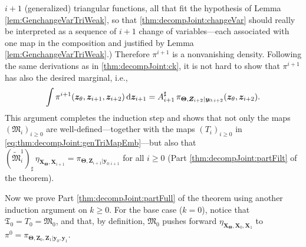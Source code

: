 \documentclass[twoside,11pt]{article}
\newcommand{\push}{_\sharp}                                      %
\newcommand{\Xb}{\boldsymbol{X}}
\newcommand{\yb}{\boldsymbol{y}}
\newcommand{\Zb}{\boldsymbol{Z}}
\newcommand{\zb}{\boldsymbol{z}}
\newcommand{\vhyp}{\boldsymbol{\Theta}}
\newcommand{\vhyps}{\theta}
\newcommand{\submap}{\mathfrak{M}}
\newcommand{\pull}{^\sharp}
\begin{document}
$i+1$ (generalized) triangular functions, all that fit the hypothesis of
Lemma \ref{lem:GenchangeVarTriWeak}, so that \eqref{thm:decompJoint:changeVar}
should really be interpreted as a sequence of $i+1$ change of
variables---each associated with one
map in the composition and justified by Lemma \ref{lem:GenchangeVarTriWeak}.)
Therefore %
$\pi^{i+1}$ is a nonvanishing density.
%
Following the same derivations as in \eqref{thm:decompJoint:ck},
it is not hard to show that $\pi^{i+1}$ has also the
desired marginal, i.e., 
%
%
%
%
%
%
%
%
%
%
%
%
%
%
%
%
%
%
%
%
%
%
%
%
%
%
%
%
%
%
\begin{equation}
\int \pi^{i+1}(\zb_{\vhyps},\zb_{i+1} , \zb_{i+2}) \, {\rm d}\zb_{i+1} 
  =
  A_{i+1}\pull\,\pi_{ {\vhyp} ,\Zb_{i+2} \vert \yb_{0:i+2}}
  (\zb_{\vhyps}, \zb_{i+2} ).%
\end{equation}
%
%
This argument completes the induction step  and shows that not only the maps
$(\submap_i)_{i \ge 0}$ are well-defined---together with the maps $(T_i)_{i \ge 0}$ in 
\eqref{eq:thm:decompJoint:genTriMapEmb}---but also that
$(\widetilde{\submap}_i^1)\push \, \eta_{\Xb_{\vhyp},\Xb_{i+1}} = 
\pi_{\vhyp,\Zb_{i+1}\vert\yb_{0:i+1}}$
for all $i \ge 0$ (Part \ref{thm:decompJoint:partFilt} of the theorem). 

Now we prove Part \ref{thm:decompJoint:partFull} of the theorem using another induction 
argument on $k\ge 0$. For the base case ($k=0$), notice that
$\mathfrak{T}_0 = T_0 = \submap_0$, and that, by definition,
$\submap_0$ pushes forward $\eta_{\Xb_{\vhyp},\Xb_0,\Xb_{1}}$ to 
$\pi^0=\pi_{ \vhyp,\Zb_0,\Zb_1\vert \yb_0, \yb_1}$.
\end{document}
